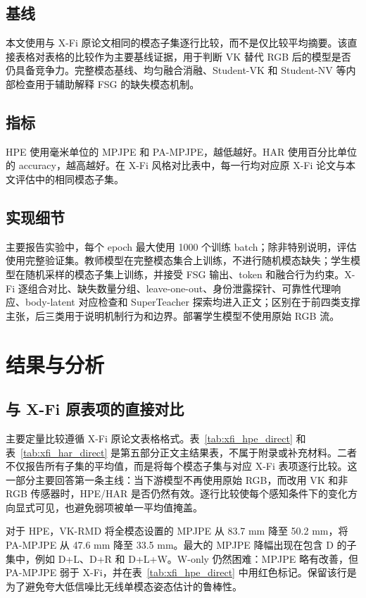 ﻿\documentclass[UTF8,twocolumn]{ctexart}
\newcommand{\method}{VK-RMD}
\newcommand{\mpjpe}{MPJPE}
\newcommand{\pampjpe}{PA-MPJPE}
\begin{document}
\subsection{基线}
本文使用与 X-Fi 原论文相同的模态子集逐行比较，而不是仅比较平均摘要。该直接表格对表格的比较作为主要基线证据，用于判断 VK 替代 RGB 后的模型是否仍具备竞争力。完整模态基线、均匀融合消融、Student-VK 和 Student-NV 等内部检查用于辅助解释 FSG 的缺失模态机制。

\subsection{指标}
HPE 使用毫米单位的 \mpjpe{} 和 \pampjpe{}，越低越好。HAR 使用百分比单位的 accuracy，越高越好。在 X-Fi 风格对比表中，每一行均对应原 X-Fi 论文与本文评估中的相同模态子集。

\subsection{实现细节}
主要报告实验中，每个 epoch 最大使用 1000 个训练 batch；除非特别说明，评估使用完整验证集。教师模型在完整模态集合上训练，不进行随机模态缺失；学生模型在随机采样的模态子集上训练，并接受 FSG 输出、token 和融合行为约束。X-Fi 逐组合对比、缺失数量分组、leave-one-out、身份泄露探针、可靠性代理响应、body-latent 对应检查和 SuperTeacher 探索均进入正文；区别在于前四类支撑主张，后三类用于说明机制行为和边界。部署学生模型不使用原始 RGB 流。

\section{结果与分析}
\clearpage
\onecolumn
\subsection{与 X-Fi 原表项的直接对比}
主要定量比较遵循 X-Fi 原论文表格格式。表~\ref{tab:xfi_hpe_direct} 和表~\ref{tab:xfi_har_direct} 是第五部分正文主结果表，不属于附录或补充材料。二者不仅报告所有子集的平均值，而是将每个模态子集与对应 X-Fi 表项逐行比较。这一部分主要回答第一条主线：当下游模型不再使用原始 RGB，而改用 VK 和非 RGB 传感器时，HPE/HAR 是否仍然有效。逐行比较使每个感知条件下的变化方向显式可见，也避免弱项被单一平均值掩盖。



对于 HPE，\method{} 将全模态设置的 \mpjpe{} 从 83.7 mm 降至 50.2 mm，将 \pampjpe{} 从 47.6 mm 降至 33.5 mm。最大的 MPJPE 降幅出现在包含 D 的子集中，例如 D+L、D+R 和 D+L+W。W-only 仍然困难：MPJPE 略有改善，但 PA-MPJPE 弱于 X-Fi，并在表~\ref{tab:xfi_hpe_direct} 中用红色标记。保留该行是为了避免夸大低信噪比无线单模态姿态估计的鲁棒性。
\end{document}
